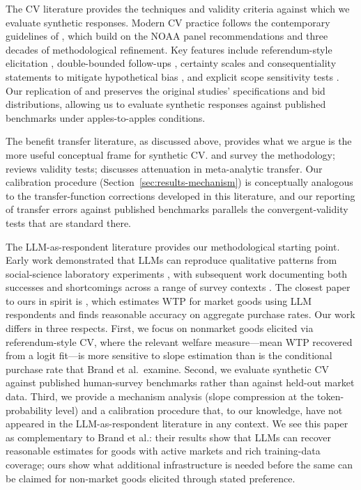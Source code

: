 \documentclass[12pt]{article}
\begin{document}
The CV literature provides the techniques and validity criteria against which we evaluate synthetic responses. Modern CV practice follows the contemporary guidelines of \textcite{Johnston2017}, which build on the NOAA panel recommendations \parencite{Arrow1993} and three decades of methodological refinement. Key features include referendum-style elicitation \parencite{Carson2007}, double-bounded follow-ups \parencite{Hanemann1991}, certainty scales and consequentiality statements to mitigate hypothetical bias \parencite{Cummings1999, Vossler2009, Herriges2010}, and explicit scope sensitivity tests \parencite{Carson1996, Heberlein2005}. Our replication of \textcite{Aldy2012} and \textcite{Giguere2020} preserves the original studies' specifications and bid distributions, allowing us to evaluate synthetic responses against published benchmarks under apples-to-apples conditions.

The benefit transfer literature, as discussed above, provides what we argue is the more useful conceptual frame for synthetic CV. \textcite{Rosenberger2017} and \textcite{Boyle2010} survey the methodology; \textcite{Loomis2015} reviews validity tests; \textcite{Bergstrom2008} discusses attenuation in meta-analytic transfer. Our calibration procedure (Section~\ref{sec:results-mechanism}) is conceptually analogous to the transfer-function corrections developed in this literature, and our reporting of transfer errors against published benchmarks parallels the convergent-validity tests that are standard there.

The LLM-as-respondent literature provides our methodological starting point. Early work demonstrated that LLMs can reproduce qualitative patterns from social-science laboratory experiments \parencite{Argyle2023, Horton2023, Aher2023}, with subsequent work documenting both successes and shortcomings across a range of survey contexts \parencite{Bisbee2024, Ross2024, vonderHeyde2025}. The closest paper to ours in spirit is \textcite{Brand2024}, which estimates WTP for market goods using LLM respondents and finds reasonable accuracy on aggregate purchase rates. Our work differs in three respects. First, we focus on nonmarket goods elicited via referendum-style CV, where the relevant welfare measure---mean WTP recovered from a logit fit---is more sensitive to slope estimation than is the conditional purchase rate that Brand et al.\ examine. Second, we evaluate synthetic CV against published human-survey benchmarks rather than against held-out market data. Third, we provide a mechanism analysis (slope compression at the token-probability level) and a calibration procedure that, to our knowledge, have not appeared in the LLM-as-respondent literature in any context. We see this paper as complementary to Brand et al.: their results show that LLMs can recover reasonable estimates for goods with active markets and rich training-data coverage; ours show what additional infrastructure is needed before the same can be claimed for non-market goods elicited through stated preference.
\end{document}
